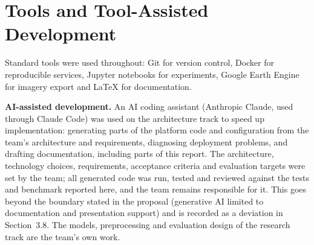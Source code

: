 \section{Tools and Tool-Assisted Development}\label{sec:tools-assisted}
Standard tools were used throughout: Git for version control, Docker for reproducible services,
Jupyter notebooks for experiments, Google Earth Engine for imagery export and \LaTeX{} for
documentation.

\textbf{AI-assisted development.} An AI coding assistant (Anthropic Claude, used through Claude Code)
was used on the architecture track to speed up implementation: generating parts of the platform code
and configuration from the team's architecture and requirements, diagnosing deployment problems, and
drafting documentation, including parts of this report. The architecture, technology choices,
requirements, acceptance criteria and evaluation targets were set by the team; all generated code was
run, tested and reviewed against the tests and benchmark reported here, and the team remains
responsible for it. This goes beyond the boundary stated in the proposal (generative AI limited to
documentation and presentation support) and is recorded as a deviation in
Section~3.8. The models, preprocessing and evaluation design of the research track are the team's
own work.

